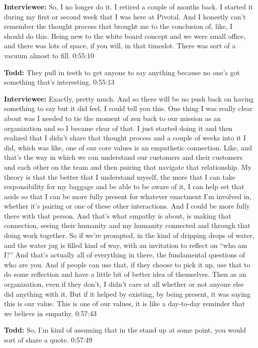 \textbf{Interviewee:}  	So, I no longer do it.  I retired a couple of months back.  I started it during my first or second week that I was here at Pivotal.  And I honestly can't remember the thought process that brought me to the conclusion of, like, I should do this.  Being new to the white board concept and we were small office, and there was lots of space, if you will, in that timeslot.  There was sort of a vacuum almost to fill.  0:55:10

\textbf{Todd:}  	They pull in teeth to get anyone to say anything because no one's got something that's interesting.  0:55:13

\textbf{Interviewee:}  	Exactly, pretty much.  And so there will be no push back on having something to say but it did feel, I could tell you this.  One thing I was really clear about was I needed to tie the moment of zen back to our mission as an organization and so I became clear of that.  I just started doing it and then realized that I didn't share that thought process and a couple of weeks into it I did,   which was like, one of our core values is an empathetic connection.  Like, and that's the way in which we can understand our customers and their customers and each other on the team and then pairing that navigate that relationship.  My theory is that the better that I understand myself, the more that I can take responsibility for my baggage and be able to be aware of it, I can help set that aside so that I can be more fully present for whatever enactment I'm involved in, whether it's pairing or one of these other interactions.  And I could be more fully there with that person.  And that's what empathy is about, is making that connection, seeing their humanity and my humanity connected and through that doing work together.  So if we're prompted, in the kind of dripping drops of water, and the water jug is filled kind of way, with an invitation to reflect on “who am I?” And that's actually all of everything in there, the fundamental questions of who are you.  And if people can use that, if they choose to pick it up, use that to do some reflection and have a little bit of better idea of themselves.  Then as an organization, even if they don't, I didn't care at all whether or not anyone else did anything with it.  But if it helped by existing, by being present, it was saying this is our value.  This is one of our values, it is like a day-to-day reminder that we believe in empathy.  0:57:43

\textbf{Todd:}  	So, I'm kind of assuming that in the stand up at some point, you would sort of share a quote.  0:57:49

